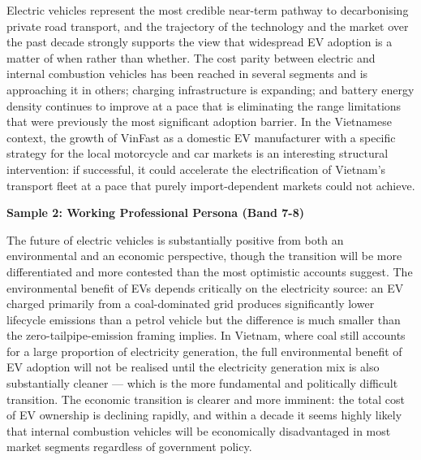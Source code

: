 Electric vehicles represent the most credible near-term pathway to decarbonising private road transport, and the trajectory of the technology and the market over the past decade strongly supports the view that widespread EV adoption is a matter of when rather than whether. The cost parity between electric and internal combustion vehicles has been reached in several segments and is approaching it in others; charging infrastructure is expanding; and battery energy density continues to improve at a pace that is eliminating the range limitations that were previously the most significant adoption barrier. In the Vietnamese context, the growth of VinFast as a domestic EV manufacturer with a specific strategy for the local motorcycle and car markets is an interesting structural intervention: if successful, it could accelerate the electrification of Vietnam's transport fleet at a pace that purely import-dependent markets could not achieve.

\textbf{Sample 2: Working Professional Persona (Band 7-8)}

The future of electric vehicles is substantially positive from both an environmental and an economic perspective, though the transition will be more differentiated and more contested than the most optimistic accounts suggest. The environmental benefit of EVs depends critically on the electricity source: an EV charged primarily from a coal-dominated grid produces significantly lower lifecycle emissions than a petrol vehicle but the difference is much smaller than the zero-tailpipe-emission framing implies. In Vietnam, where coal still accounts for a large proportion of electricity generation, the full environmental benefit of EV adoption will not be realised until the electricity generation mix is also substantially cleaner — which is the more fundamental and politically difficult transition. The economic transition is clearer and more imminent: the total cost of EV ownership is declining rapidly, and within a decade it seems highly likely that internal combustion vehicles will be economically disadvantaged in most market segments regardless of government policy.

\separator


